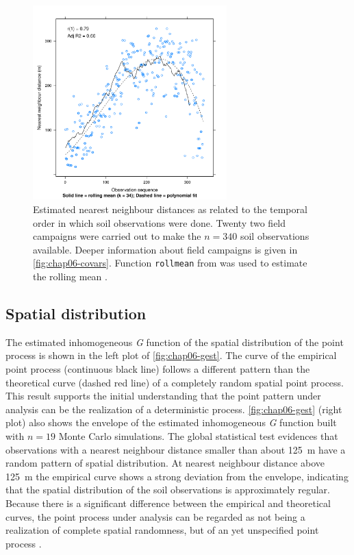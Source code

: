 \begin{figure}[!ht]
 \centering
 \includegraphics[trim=0mm 0mm 0mm 12mm,clip=true,width=7.5cm]{fig/chap06-nndistG.pdf}
 \caption{Estimated nearest neighbour distances as related to the temporal order in which soil observations 
 were done. Twenty two field campaigns were carried out to make the $n = 340$ soil observations available.
 Deeper information about field campaigns is given in \autoref{fig:chap06-covars}. Function \texttt{rollmean} 
 from  was used to estimate the rolling mean \cite{ZeileisEtAl2005}.}
 \label{fig:chap06-nndistG}
\end{figure}

\subsection{Spatial distribution}

The estimated inhomogeneous \emph{G} function of the spatial distribution of the point process is shown in the 
left plot of \autoref{fig:chap06-gest}. The curve of the empirical point process (continuous black line) 
follows a different pattern than the theoretical curve (dashed red line) of a completely random spatial point 
process. This result supports the initial understanding that the point pattern under analysis can be the 
realization of a deterministic process. \autoref{fig:chap06-gest} (right plot) also shows the envelope of the 
estimated inhomogeneous \emph{G} function built with $n = 19$ Monte Carlo simulations. The global statistical 
test evidences that observations with a nearest neighbour distance smaller than about \SI{125}{\m} have a 
random pattern of spatial distribution. At nearest neighbour distance above \SI{125}{\m} the empirical curve 
shows a strong deviation from the envelope, indicating that the spatial distribution of the soil observations 
is approximately regular. Because there is a significant difference between the empirical and theoretical 
curves, the point process under analysis can be regarded as not being a realization of complete spatial 
randomness, but of an yet unspecified point process \cite{Baddeley2010}.

